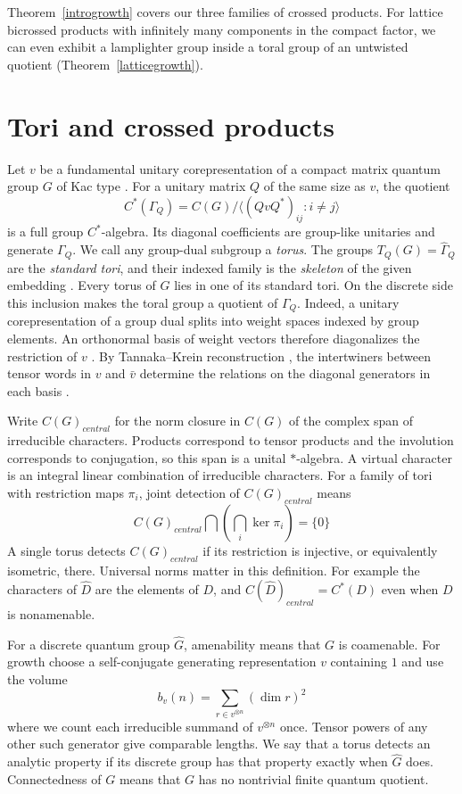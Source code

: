 \documentclass[11pt,a4paper]{article}
\theoremstyle{remark}
\begin{document}
Theorem~\ref{introgrowth} covers our three families of crossed products.
For lattice bicrossed products with infinitely many components in the
compact factor, we can even exhibit a lamplighter group inside a toral
group of an untwisted quotient (Theorem~\ref{latticegrowth}).

\section{Tori and crossed products}
Let $v$ be a fundamental unitary corepresentation of a compact matrix
quantum group $G$ of Kac type \cite{wcmp}.
For a unitary matrix $Q$ of the same size as $v$, the quotient
\[
 C^*(\Gamma_Q)=C(G)\big/\big\langle (QvQ^*)_{ij}:i\ne j\big\rangle
\]
is a full group $C^*$-algebra. Its diagonal coefficients are group-like
unitaries and generate $\Gamma_Q$. We call any group-dual subgroup a
\emph{torus}. The groups $T_Q(G)=\widehat{\Gamma}_Q$ are the
\emph{standard tori}, and their indexed family is the \emph{skeleton} of
the given embedding \cite[Chapter~13]{qg}. Every torus of $G$ lies in
one of its standard tori. On the discrete side this inclusion makes the
toral group a quotient of $\Gamma_Q$. Indeed, a
unitary corepresentation of a group dual splits into weight spaces
indexed by group elements. An orthonormal basis of weight vectors
therefore diagonalizes the restriction of $v$ \cite{bbd,bp}. By Tannaka--Krein reconstruction
\cite{wtk}, the intertwiners between tensor words in $v$ and $\bar v$
determine the relations on the diagonal generators in each basis
\cite[Section~6]{bp}.

Write $C(G)_{central}$ for the norm closure in $C(G)$ of the complex span of
irreducible characters. Products correspond to tensor products and the
involution corresponds to conjugation, so this span is a unital
$*$-algebra. A virtual character is an integral linear combination of
irreducible characters. For a family of tori with restriction maps
$\pi_i$, joint detection of $C(G)_{central}$ means
\[
 C(G)_{central}\mathbin{\bigcap}\left(\bigcap_i\ker\pi_i\right)=\{0\}
\]
A single torus detects $C(G)_{central}$ if its restriction is injective, or
equivalently isometric, there. Universal norms matter in this definition.
For example the characters of $\widehat D$ are the elements of $D$,
and $C(\widehat D)_{central}=C^*(D)$ even when $D$ is nonamenable.

For a discrete quantum group $\widehat G$, amenability means that $G$ is
coamenable. For growth choose a self-conjugate generating representation
$v$ containing $1$ and use the volume
\[
 b_v(n)=\sum_{r\in v^{\otimes n}}(\dim r)^2
\]
where we count each irreducible summand of $v^{\otimes n}$ once. Tensor powers of any other
such generator give comparable lengths. We say that a torus detects an
analytic property if its discrete group has that property exactly when
$\widehat G$ does. Connectedness of $G$ means that $G$ has no nontrivial
finite quantum quotient.
\end{document}
